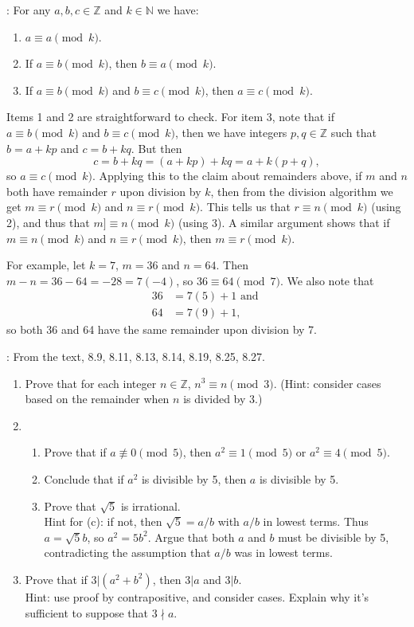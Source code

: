 \documentclass[letterpaper,12pt]{article}
\newcommand{\N}{\mathbb{N}}
\newcommand{\Z}{\mathbb{Z}}
\newcommand{\modd}[3]{#1\equiv #2 \pmod{#3}}
\begin{document}
: For any $a,b,c\in \Z$ and $k\in\N$ we have:
\begin{enumerate}
 \item $\modd{a}{a}{k}$.
 \item If $\modd{a}{b}{k}$, then $\modd{b}{a}{k}$.
 \item If $\modd{a}{b}{k}$ and $\modd{b}{c}{k}$, then $\modd{a}{c}{k}$.
\end{enumerate}
Items 1 and 2 are straightforward to check. For item 3, note that if $\modd{a}{b}{k}$ and $\modd{b}{c}{k}$, then we have integers $p,q\in\Z$ such that $b=a+kp$ and $c = b+kq$. But then
\[
 c = b+kq = (a+kp)+kq = a + k(p+q),
\]
so $\modd{a}{c}{k}$. Applying this to the claim about remainders above, if $m$ and $n$ both have remainder $r$ upon division by $k$, then from the division algorithm we get $\modd{m}{r}{k}$ and $\modd{n}{r}{k}$. This tells us that $\modd{r}{n}{k}$ (using 2), and thus that $\modd{m]}{n}{k}$ (using 3). A similar argument shows that if $\modd{m}{n}{k}$ and $\modd{n}{r}{k}$, then $\modd{m}{r}{k}$.

For example, let $k=7$, $m=36$ and $n=64$. Then $m-n = 36-64 = -28 = 7(-4)$, so $\modd{36}{64}{7}$. We also note that
\begin{align*}
 36 & = 7(5)+1 \text{ and }\\
 64 & = 7(9)+1,
\end{align*}
so both 36 and 64 have the same remainder upon division by 7.

: From the text, 8.9, 8.11, 8.13, 8.14, 8.19, 8.25, 8.27.
\begin{enumerate}
 \item Prove that for each integer $n\in\Z$, $\modd{n^3}{n}{3}$. (Hint: consider cases based on the remainder when $n$ is divided by 3.)
 \item \begin{enumerate}
        \item Prove that if $a\not\equiv 0 \pmod{5}$, then $\modd{a^2}{1}{5}$ or $\modd{a^2}{4}{5}$.
        \item Conclude that if $a^2$ is divisible by 5, then $a$ is divisible by 5.
        \item Prove that $\sqrt{5}$ is irrational.\\
Hint for (c): if not, then $\sqrt{5}=a/b$ with $a/b$ in lowest terms. Thus $a=\sqrt{5}b$, so $a^2=5b^2$. Argue that both $a$ and $b$ must be divisible by 5, contradicting the assumption that $a/b$ was in lowest terms.
       \end{enumerate}
 \item Prove that if $3|(a^2+b^2)$, then $3|a$ and $3|b$.\\
Hint: use proof by contrapositive, and consider cases. Explain why it's sufficient to suppose that $3\nmid a$.

\end{enumerate}
\end{document}
